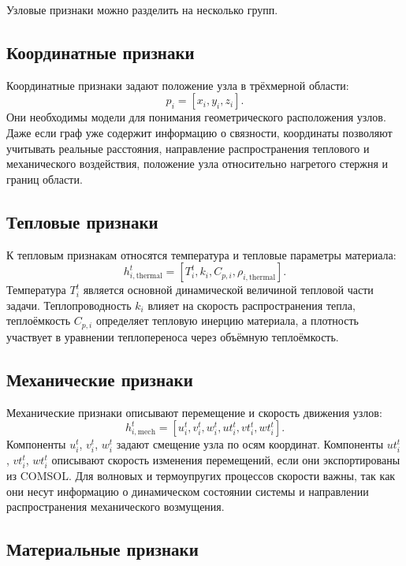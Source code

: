 Узловые признаки можно разделить на несколько групп.

\subsection{Координатные признаки}

Координатные признаки задают положение узла в трёхмерной области:
\begin{equation}
    p_i = [x_i,y_i,z_i].
\end{equation}
Они необходимы модели для понимания геометрического расположения узлов. Даже если граф уже содержит информацию о связности, координаты позволяют учитывать реальные расстояния, направление распространения теплового и механического воздействия, положение узла относительно нагретого стержня и границ области.

\subsection{Тепловые признаки}

К тепловым признакам относятся температура и тепловые параметры материала:
\begin{equation}
    h_{i,\mathrm{thermal}}^t=[T_i^t,k_i,C_{p,i},\rho_{i,\mathrm{thermal}}].
\end{equation}
Температура $T_i^t$ является основной динамической величиной тепловой части задачи. Теплопроводность $k_i$ влияет на скорость распространения тепла, теплоёмкость $C_{p,i}$ определяет тепловую инерцию материала, а плотность участвует в уравнении теплопереноса через объёмную теплоёмкость.

\subsection{Механические признаки}

Механические признаки описывают перемещение и скорость движения узлов:
\begin{equation}
    h_{i,\mathrm{mech}}^t=[u_i^t,v_i^t,w_i^t,ut_i^t,vt_i^t,wt_i^t].
\end{equation}
Компоненты $u_i^t$, $v_i^t$, $w_i^t$ задают смещение узла по осям координат. Компоненты $ut_i^t$, $vt_i^t$, $wt_i^t$ описывают скорость изменения перемещений, если они экспортированы из COMSOL. Для волновых и термоупругих процессов скорости важны, так как они несут информацию о динамическом состоянии системы и направлении распространения механического возмущения.

\subsection{Материальные признаки}

